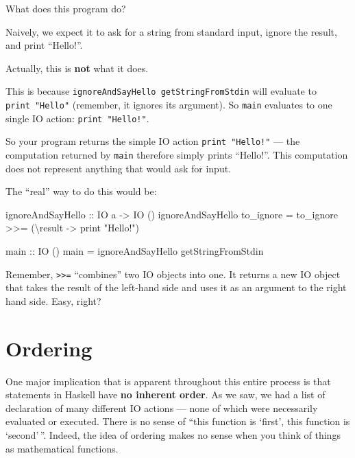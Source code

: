 \documentclass[]{article}
\newenvironment{Shaded}{}{}
\newcommand{\DataTypeTok}[1]{\textcolor[rgb]{0.56,0.13,0.00}{{#1}}}
\newcommand{\StringTok}[1]{\textcolor[rgb]{0.25,0.44,0.63}{{#1}}}
\newcommand{\OtherTok}[1]{\textcolor[rgb]{0.00,0.44,0.13}{{#1}}}
\newcommand{\FunctionTok}[1]{\textcolor[rgb]{0.02,0.16,0.49}{{#1}}}
\newcommand{\NormalTok}[1]{{#1}}
\begin{document}
What does this program do?

Naively, we expect it to ask for a string from standard input, ignore
the result, and print ``Hello!''.

Actually, this is \textbf{not} what it does.

This is because \texttt{ignoreAndSayHello\ getStringFromStdin} will
evaluate to \texttt{print\ "Hello"} (remember, it ignores its argument).
So \texttt{main} evaluates to one single IO action:
\texttt{print\ "Hello!"}.

So your program returns the simple IO action \texttt{print\ "Hello!"}
--- the computation returned by \texttt{main} therefore simply prints
``Hello!''. This computation does not represent anything that would ask
for input.

The ``real'' way to do this would be:

\begin{Shaded}
\begin{Highlighting}[]
\OtherTok{ignoreAndSayHello ::} \DataTypeTok{IO} \NormalTok{a }\OtherTok{->} \DataTypeTok{IO} \NormalTok{()}
\NormalTok{ignoreAndSayHello to_ignore }\FunctionTok{=} \NormalTok{to_ignore }\FunctionTok{>>=} \NormalTok{(\textbackslash{}result }\OtherTok{->} \NormalTok{print }\StringTok{"Hello!"}\NormalTok{)}

\OtherTok{main ::} \DataTypeTok{IO} \NormalTok{()}
\NormalTok{main }\FunctionTok{=} \NormalTok{ignoreAndSayHello getStringFromStdin}
\end{Highlighting}
\end{Shaded}

Remember, \texttt{\textgreater{}\textgreater{}=} ``combines'' two IO
objects into one. It returns a new IO object that takes the result of
the left-hand side and uses it as an argument to the right hand side.
Easy, right?

\section{Ordering}\label{ordering}

One major implication that is apparent throughout this entire process is
that statements in Haskell have \textbf{no inherent order}. As we saw,
we had a list of declaration of many different IO actions --- none of
which were necessarily evaluated or executed. There is no sense of
``this function is `first', this function is `second'\,''. Indeed, the
idea of ordering makes no sense when you think of things as mathematical
functions.
\end{document}
